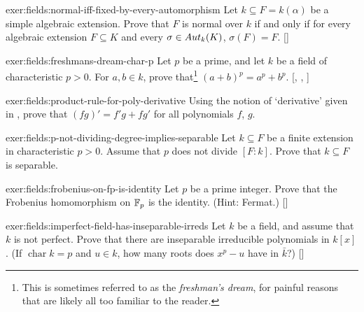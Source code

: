 \begin{exer}{}{exer:fields:normal-iff-fixed-by-every-automorphism}
  Let $k \subseteq F = k(\alpha)$ be a simple algebraic
  extension. Prove that $F$ is normal over $k$ if and only if for
  every algebraic extension $F \subseteq K$ and every
  $\sigma \in Aut_k(K)$, $\sigma(F) =
  F$. []
\end{exer}
\begin{exer}{}{exer:fields:freshmans-dream-char-p}
  Let $p$ be a prime, and let $k$ be a field of characteristic
  $p > 0$. For $a, b \in k$, prove that\footnote{This is sometimes
    referred to as the \emph{freshman's dream}, for painful reasons
    that are likely all too familiar to the reader.}
  $(a + b)^p = a^p +
  b^p$. [,
  ,
  ]
\end{exer}
\begin{exer}{}{exer:fields:product-rule-for-poly-derivative}
  Using the notion of `derivative' given in
  , prove that
  $(fg)' = f'g + fg'$ for all polynomials $f$, $g$.
\end{exer}
\begin{exer}{}{exer:fields:p-not-dividing-degree-implies-separable}
  Let $k \subseteq F$ be a finite extension in characteristic $p > 0$.
  Assume that $p$ does not divide $[F : k]$. Prove that
  $k \subseteq F$ is separable.
\end{exer}
\begin{exer}{}{exer:fields:frobenius-on-fp-is-identity}
  Let $p$ be a prime integer. Prove that the Frobenius homomorphism on
  $\mathbb{F}_p$ is the identity. (Hint: Fermat.)
  []
\end{exer}
\begin{exer}{}{exer:fields:imperfect-field-has-inseparable-irreds}
  Let $k$ be a field, and assume that $k$ is not perfect. Prove that
  there are inseparable irreducible polynomials in $k[x]$. (If
  $\operatorname{char} k = p$ and $u \in k$, how many roots does
  $x^p - u$ have in $\bar{k}$?)
  []
\end{exer}
